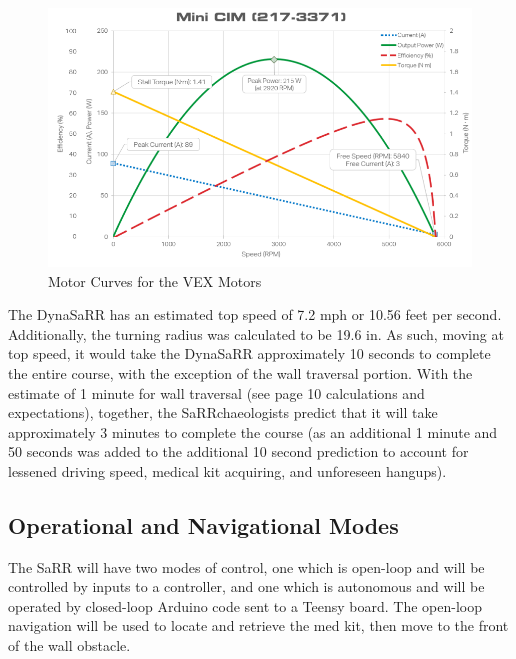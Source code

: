 \documentclass[12pt]{article}
\begin{document}
\begin{figure}[H]
    \centering
    \includegraphics[width=1.1\linewidth]{PreliminaryDesignReport/mini-cim-motor-curve-20151207.png}
    \caption{Motor Curves for the VEX Motors}
    \label{fig:my_label}
\end{figure}

The DynaSaRR has an estimated top speed of 7.2 mph or 10.56 feet per second. Additionally, the turning radius was calculated to be 19.6 in. As such, moving at top speed, it would take the DynaSaRR approximately 10 seconds to complete the entire course, with the exception of the wall traversal portion. With the estimate of 1 minute for wall traversal (see page 10 calculations and expectations), together, the SaRRchaeologists predict that it will take approximately 3 minutes to complete the course (as an additional 1 minute and 50 seconds was added to the additional 10 second prediction to account for lessened driving speed, medical kit acquiring, and unforeseen hangups). \\



\subsection{Operational and Navigational Modes}
The SaRR will have two modes of control, one which is open-loop and will be controlled by inputs to a controller, and one which is autonomous and will be operated by closed-loop Arduino code sent to a Teensy board. The open-loop navigation will be used to locate and retrieve the med kit, then move to the front of the wall obstacle. \\
\end{document}
